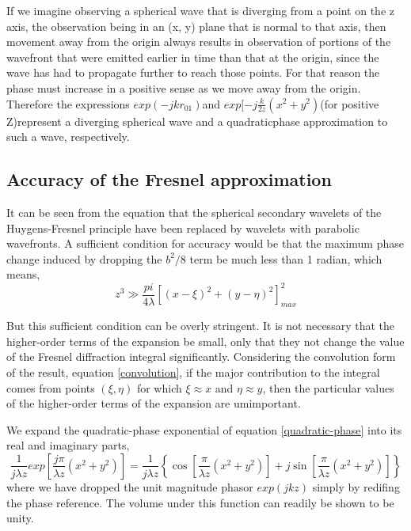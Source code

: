 \documentclass[../main.tex]{subfiles}
\begin{document}
	If we imagine observing a spherical wave that is diverging from a point on the z axis, the observation being in an (x, y) plane that is normal to that axis, then movement away from the origin always results in observation of portions of the wavefront that were emitted earlier in time than that at the origin, since the wave has had to propagate further to reach those points. For that reason the phase must increase in a positive sense as we move away from the origin. Therefore the expressions $exp(-jkr_{01})$and $exp[-j\frac{k}{2z}(x^2+y^2)$(for positive Z)represent a diverging spherical wave and a quadraticphase approximation to such a wave, respectively.

	\subsection{Accuracy of the Fresnel approximation}
	It can be seen from the equation that the spherical secondary wavelets of the Huygens-Fresnel principle have been replaced by wavelets with parabolic wavefronts. A sufficient condition for accuracy would be that the maximum phase change induced by dropping the $b^2/8$ term be much less than 1 radian, which means,
	\begin{equation}
	z^3\gg\frac{pi}{4\lambda}[(x-\xi)^2+(y-\eta)^2]^2_{max}
	\end{equation}

	But this sufficient condition can be overly stringent. It is not necessary that the higher-order terms of the expansion be small, only that they not change the value of the Fresnel diffraction integral significantly. Considering the convolution form of the result, equation \ref{convolution}, if the major contribution to the integral comes from points $(\xi,\eta)$ for which $\xi\approx x$ and $\eta \approx y$, then the particular values of the higher-order terms of the expansion are umimportant.

	We expand the quadratic-phase exponential of equation \ref{quadratic-phase} into its real and imaginary parts,
	\begin{equation}
	\frac{1}{j\lambda z}exp\left[\frac{j\pi}{\lambda z}(x^2+y^2)\right]=\frac{1}{j\lambda z}\left\{\cos\left[\frac{\pi}{\lambda z}(x^2+y^2)\right]+j\sin\left[\frac{\pi}{\lambda z}(x^2+y^2)\right]\right\}
	\end{equation}
	where we have dropped the unit magnitude phasor $exp(jkz)$ simply by redifing the phase reference. The volume under this function can readily be shown to be unity. 
\end{document}
